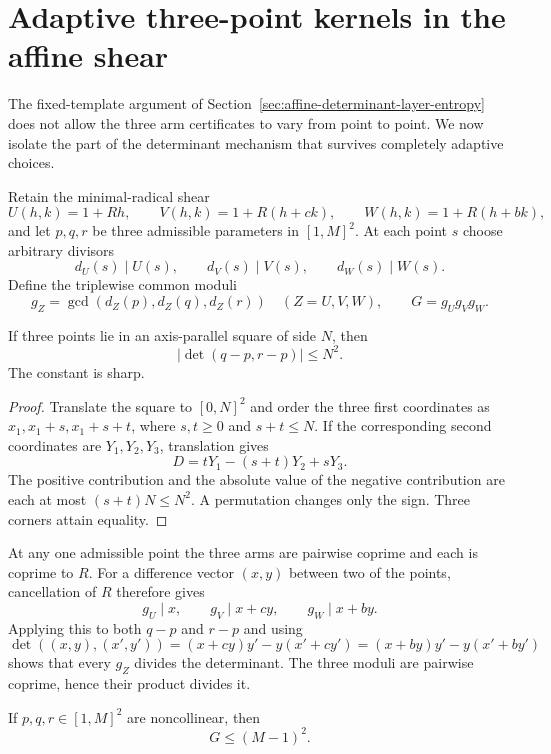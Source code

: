 \section{Adaptive three-point kernels in the affine shear}
\label{sec:affine-adaptive-common-kernel}

The fixed-template argument of
Section~\ref{sec:affine-determinant-layer-entropy} does not allow the three
arm certificates to vary from point to point.  We now isolate the part of
the determinant mechanism that survives completely adaptive choices.

Retain the minimal-radical shear
\[
 U(h,k)=1+Rh,\qquad
 V(h,k)=1+R(h+ck),\qquad
 W(h,k)=1+R(h+bk),
\]
and let $p,q,r$ be three admissible parameters in $[1,M]^2$.  At each point
$s$ choose arbitrary divisors
\[
 d_U(s)\mid U(s),\qquad d_V(s)\mid V(s),\qquad d_W(s)\mid W(s).
\]
Define the triplewise common moduli
\[
 g_Z=\gcd(d_Z(p),d_Z(q),d_Z(r))\quad(Z=U,V,W),\qquad
 G=g_Ug_Vg_W.
\]

\begin{lemma}
\label{lem:sharp-square-triangle}
If three points lie in an axis-parallel square of side $N$, then
\[
                 |\det(q-p,r-p)|\le N^2.
\]
The constant is sharp.
\end{lemma}

\begin{proof}
Translate the square to $[0,N]^2$ and order the three first coordinates as
$x_1,x_1+s,x_1+s+t$, where $s,t\ge0$ and $s+t\le N$.  If the corresponding
second coordinates are $Y_1,Y_2,Y_3$, translation gives
\[
 D=tY_1-(s+t)Y_2+sY_3.
\]
The positive contribution and the absolute value of the negative
contribution are each at most $(s+t)N\le N^2$.  A permutation changes only
the sign.  Three corners attain equality.
\end{proof}

At any one admissible point the three arms are pairwise coprime and each is
coprime to $R$.  For a difference vector $(x,y)$ between two of the points,
cancellation of $R$ therefore gives
\[
 g_U\mid x,\qquad g_V\mid x+cy,\qquad g_W\mid x+by.
\]
Applying this to both $q-p$ and $r-p$ and using
\[
 \det((x,y),(x',y'))
 =(x+cy)y'-y(x'+cy')
 =(x+by)y'-y(x'+by')
\]
shows that every $g_Z$ divides the determinant.  The three moduli are
pairwise coprime, hence their product divides it.

\begin{theorem}
\label{thm:adaptive-common-kernel-box}
If $p,q,r\in[1,M]^2$ are noncollinear, then
\[
                            G\le(M-1)^2.
\]
\end{theorem}

